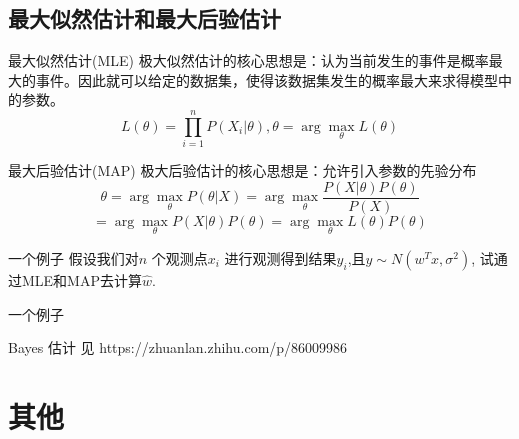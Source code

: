 \documentclass{ctexbeamer}
\begin{document}
\subsection{最大似然估计和最大后验估计}
\begin{frame}{最大似然估计(MLE)}
极大似然估计的核心思想是：认为当前发生的事件是概率最大的事件。因此就可以给定的数据集，使得该数据集发生的概率最大来求得模型中的参数。
$$L(\theta) = \prod_{i=1}^n P(X_i|\theta), \theta = \arg\max_{\theta} L(\theta)$$

\end{frame}
\begin{frame}{最大后验估计(MAP)}
极大后验估计的核心思想是：允许引入参数的先验分布
$$\theta = \arg\max_{\theta} P(\theta|X) = \arg\max_{\theta} \frac{P(X|\theta)P(\theta)}{P(X)}$$
$$=\arg\max_{\theta} {P(X|\theta)P(\theta)}=\arg\max_{\theta} L(\theta)P(\theta)$$
\end{frame}


\begin{frame}{一个例子}
假设我们对$n$ 个观测点$x_i$ 进行观测得到结果$y_i$,且$y\sim N(w^Tx,\sigma^2)$, 试通过MLE和MAP去计算$\hat w.$
\end{frame}
\begin{frame}{一个例子}

\end{frame}

\begin{frame}{Bayes 估计}
见 https://zhuanlan.zhihu.com/p/86009986
\end{frame}


\section{其他}
\end{document}
